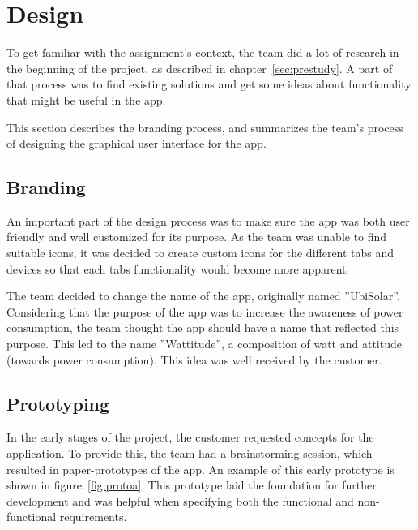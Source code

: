 \section{Design}
To get familiar with the assignment's context, the team did a lot of research in the beginning of the project, as described in chapter~\ref{sec:prestudy}. A part of that process was to find existing solutions and get some ideas about functionality that might be useful in the app.

This section describes the branding process, and summarizes the team's process of designing the graphical user interface for the app.

\subsection{Branding}
An important part of the design process was to make sure the app was both user friendly and well customized for its purpose. As the team was unable to find suitable icons, it was decided to create custom icons for the different tabs and devices so that each tabs functionality would become more apparent.

The team decided to change the name of the app, originally named ''UbiSolar''. Considering that the purpose of the app was to increase the awareness of power consumption, the team thought the app should have a name that reflected this purpose. This led to the name ''Wattitude'', a composition of watt and attitude (towards power consumption). This idea was well received by the customer.

\subsection{Prototyping}
In the early stages of the project, the customer requested concepts for the application. To provide this, the team had a brainstorming session, which resulted in paper-prototypes of the app. An example of this early prototype is shown in figure~\ref{fig:protoa}. This prototype laid the foundation for further development and was helpful when specifying both the functional and non-functional requirements.

